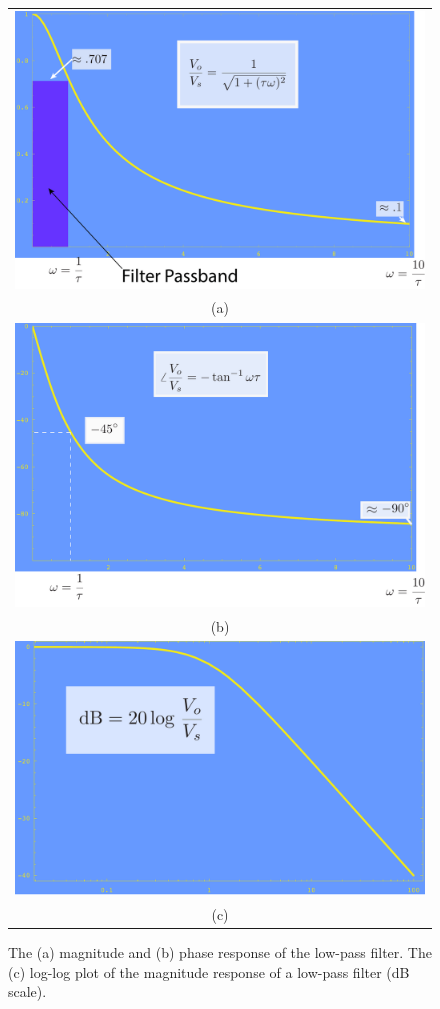 \begin{figure}[tbp]
\centering
\begin{tabular}{c}
\includegraphics[width=.65\columnwidth]{mag}\\
(a)\\
\includegraphics[width=.65\columnwidth]{phase}\\
(b)\\
\includegraphics[width=.65\columnwidth]{dB}\\
(c)\\
\end{tabular}
\caption{The (a) magnitude and (b) phase response of the low-pass filter. The (c) log-log plot of the magnitude response of a low-pass filter (dB scale).}
\label{fig:magphase}
\end{figure}
